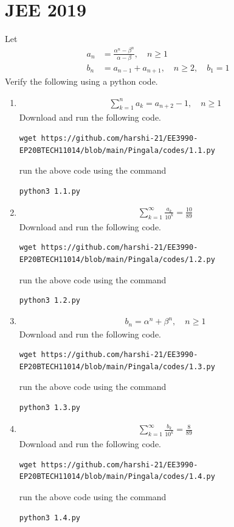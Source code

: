 \documentclass[journal,12pt,twocolumn]{IEEEtran}
\renewcommand\thesection{\arabic{section}}
\begin{document}
\section{JEE 2019}
Let 
\begin{align}
	a_n &= \frac{\alpha^{n}-\beta^{n}}{\alpha - \beta}, \quad n \ge 1
	\\
	b_n &= a_{n-1} + a_{n+1}, \quad n \ge 2, \quad b_1 =1
	\label{eq:10-orig-diff}
\end{align}
Verify the following using a python code.
\begin{enumerate}[label=\thesection.\arabic*
,ref=\thesection.\theenumi]
\item 
\begin{align}
	\sum_{k=1}^{n}a_k = a_{n+2}-1, \quad n \ge 1
\end{align}
\solution Download and run the following code.
\begin{lstlisting}
wget https://github.com/harshi-21/EE3990-EP20BTECH11014/blob/main/Pingala/codes/1.1.py
\end{lstlisting}
run the above code using the command
\begin{lstlisting}
python3 1.1.py
\end{lstlisting}

\item 
\begin{align}
	\sum_{k=1}^{\infty}\frac{a_k}{10^k} =\frac{10}{89}
\end{align}
\solution Download and run the following code.
\begin{lstlisting}
wget https://github.com/harshi-21/EE3990-EP20BTECH11014/blob/main/Pingala/codes/1.2.py
\end{lstlisting}
run the above code using the command
\begin{lstlisting}
python3 1.2.py
\end{lstlisting}

\item 
\begin{align}
	b_n =\alpha^n + \beta^n, \quad n \ge 1
\end{align}
\solution Download and run the following code.
\begin{lstlisting}
wget https://github.com/harshi-21/EE3990-EP20BTECH11014/blob/main/Pingala/codes/1.3.py
\end{lstlisting}
run the above code using the command
\begin{lstlisting}
python3 1.3.py
\end{lstlisting}

\item 
\begin{align}
	\sum_{k=1}^{\infty}\frac{b_k}{10^k} =\frac{8}{89}
\end{align}
\solution Download and run the following code.
\begin{lstlisting}
wget https://github.com/harshi-21/EE3990-EP20BTECH11014/blob/main/Pingala/codes/1.4.py
\end{lstlisting}
run the above code using the command
\begin{lstlisting}
python3 1.4.py
\end{lstlisting}


\end{enumerate}
\end{document}
